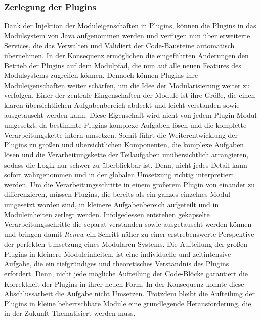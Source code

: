  \subsubsection{Zerlegung der Plugins}
	Dank der Injektion der Moduleigenschaften in Plugins, können die Plugins in das Modulsystem von Java aufgenommen werden und verfügen nun über erweiterte Services, die das Verwalten und Validiert der Code-Bausteine automatisch übernehmen. In der Konsequenz ermöglichen die eingeführten Änderungen den Betrieb der Plugins auf dem Modulpfad, die nun auf alle neuen Features des Modulsystems zugreifen können. Dennoch können Plugins ihre Moduleigenschaften weiter schärfen, um die Idee der Modularisierung weiter zu verfolgen. \newline
	Einer der zentrale Eingenschaften der Module ist ihre Größe, die einen klaren übersichtlichen Aufgabenbereich abdeckt und leicht verstanden sowie ausgetauscht werden kann. Diese Eigenschaft wird nicht von jedem Plugin-Modul umgesetzt, da bestimmte Plugins komplexe Aufgaben lösen und die komplette Verarbeitungskette intern umsetzen. Somit führt die Weiterentwicklung der Plugins zu großen und übersichtlichen Komponenten, die komplexe Aufgaben lösen und die Verarbeitungskette der Teilaufgaben unübersichtlich arrangieren, sodass die Logik nur schwer zu überblickbar ist. Denn, nicht jedes Detail kann sofort wahrgenommen und in der globalen Umsetzung richtig interpretiert werden.\newline
	Um die Verarbeitungsschritte in einem größerem Plugin von einander zu differenzieren, müssen Plugins, die bereits als ein ganzes einzelnes Modul umgesetzt worden sind, in kleinere Aufgabenbereich aufgeteilt und in Moduleinheiten zerlegt werden. Infolgedessen entstehen gekapselte Verarbeitungsschritte die separat verstanden sowie ausgetauscht werden können und bringen damit  \textit{Renew} ein Schritt näher zu einer erstrebenswerte Perspektive der perfekten Umsetzung eines Modularen Systems. \newline
	Die Aufteilung der großen Plugins in kleinere Moduleinheiten, ist eine individuelle und zeitintensive Aufgabe, die ein tiefgründiges und theoretisches Verständnis des Plugins erfordert. Denn, nicht jede mögliche Aufteilung der Code-Blöcke garantiert die Korrektheit der Plugins in ihrer neuen Form. \newline
	In der Konsequenz konnte diese Abschlussarbeit die Aufgabe nicht Umsetzen. Trotzdem bleibt die Aufteilung der Plugins in kleine beherrschbare Module eine grundlegende Herausforderung, die in der Zukunft Thematisiert werden muss. 


